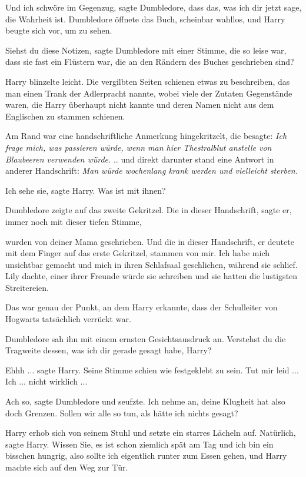 \glqq{}Und ich schwöre im Gegenzug\grqq{}, sagte Dumbledore, \glqq{}dass das, was
ich dir jetzt sage, die Wahrheit ist.\grqq{} Dumbledore öffnete das Buch,
scheinbar wahllos, und Harry beugte sich vor, um zu sehen.

\glqq{}Siehst du diese Notizen\grqq{}, sagte Dumbledore mit einer Stimme, die so
leise war, dass sie fast ein Flüstern war, \glqq{}die an den Rändern des Buches
geschrieben sind?\grqq{}

Harry blinzelte leicht. Die vergilbten Seiten schienen etwas zu beschreiben, das
man einen Trank der Adlerpracht nannte, wobei viele der Zutaten Gegenstände
waren, die Harry überhaupt nicht kannte und deren Namen nicht aus dem Englischen
zu stammen schienen.

Am Rand war eine handschriftliche Anmerkung hingekritzelt, die besagte:
\emph{Ich frage mich, was passieren würde, wenn man hier Thestralblut anstelle
von Blaubeeren verwenden würde.} .. und direkt darunter stand eine Antwort in
anderer Handschrift: \emph{Man würde wochenlang krank werden und vielleicht
sterben.}

\glqq{}Ich sehe sie\grqq{}, sagte Harry. \glqq{}Was ist mit ihnen?\grqq{}

Dumbledore zeigte auf das zweite Gekritzel. \glqq{}Die in dieser
Handschrift\grqq{}, sagte er, immer noch mit dieser tiefen Stimme,

\glqq{}wurden von deiner Mama geschrieben. Und die in dieser
Handschrift\grqq{}, er deutete mit dem Finger auf das erste Gekritzel, \glqq{}
stammen von mir. Ich habe mich unsichtbar gemacht und mich in ihren Schlafsaal
geschlichen, während sie schlief. Lily dachte, einer ihrer Freunde würde sie
schreiben und sie hatten die lustigsten Streitereien.\grqq{}

Das war genau der Punkt, an dem Harry erkannte, dass der Schulleiter von
Hogwarts tatsächlich verrückt war.

Dumbledore sah ihn mit einem ernsten Gesichtsausdruck an. \glqq{}Verstehst du die
Tragweite dessen, was ich dir gerade gesagt habe, Harry?\grqq{}

\glqq{}Ehhh ...\grqq{} sagte Harry. Seine Stimme schien wie festgeklebt zu sein.
\glqq{}Tut mir leid ... Ich ... nicht wirklich ...\grqq{}

\glqq{}Ach so\grqq{}, sagte Dumbledore und seufzte. \glqq{}Ich nehme an, deine
Klugheit hat also doch Grenzen. Sollen wir alle so tun, als hätte ich nichts
gesagt?\grqq{}

Harry erhob sich von seinem Stuhl und setzte ein starres Lächeln auf. \glqq{}
Natürlich\grqq{}, sagte Harry. \glqq{}Wissen Sie, es ist schon ziemlich spät am
Tag und ich bin ein bisschen hungrig, also sollte ich eigentlich runter zum
Essen gehen\grqq{}, und Harry machte sich auf den Weg zur Tür.

